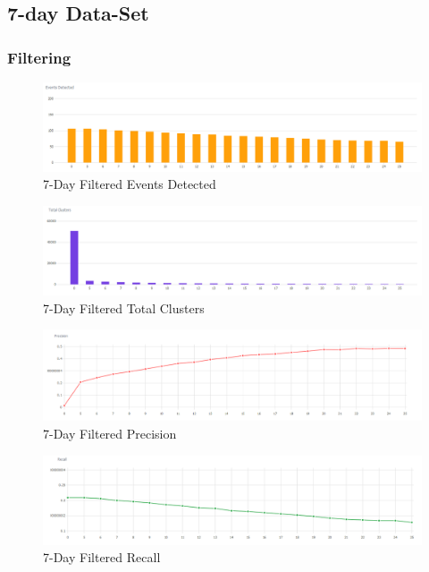 \documentclass[a4paper,portrait,12pt]{article}
\begin{document}
\subsection{7-day Data-Set}
\subsubsection{Filtering}

\begin{figure}[H]
	\centering
	\includegraphics[width=\linewidth]{images/7days-filtered-events-detected.png}
	\caption{7-Day Filtered Events Detected}
	\label{fig:7day-filtered-events-detected}
\end{figure}

\begin{figure}[H]
	\centering
	\includegraphics[width=\linewidth]{images/7days-filtered-total-clusters.png}
	\caption{7-Day Filtered Total Clusters}
	\label{fig:7days-filtered-total-clusters}
\end{figure}

\begin{figure}[H]
	\centering
	\includegraphics[width=\linewidth]{images/7days-filtered-precision.png}
	\caption{7-Day Filtered Precision}
	\label{fig:7days-filtered-precision}
\end{figure}

\begin{figure}[H]
	\centering
	\includegraphics[width=\linewidth]{images/7days-filtered-recall.png}
	\caption{7-Day Filtered Recall}
	\label{fig:7days-filtered-recall}
\end{figure}
\end{document}
